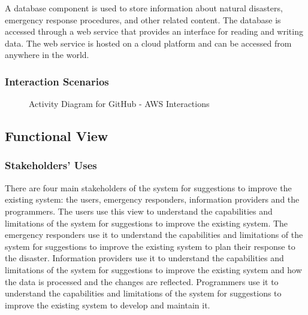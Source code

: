 \documentclass[a4paper]{article}
\begin{document}
    A database component is used to store information about natural disasters, emergency response procedures, and other related
    content. The database is accessed through a web service that provides an interface for reading and writing data. The web
    service is hosted on a cloud platform and can be accessed from anywhere in the world.
    
    \begin{table}[H]
    \end{table}
    \vspace{1cm}

    \subsubsection{Interaction Scenarios}
    \begin{figure}
        
        \caption{Activity Diagram for GitHub - AWS Interactions}
    \end{figure}
    
    \subsection{Functional View}
    \subsubsection{Stakeholders' Uses}
    There are four main stakeholders of the system for suggestions to improve the existing system: the users, emergency responders,
    information providers and the programmers. The users use this view to understand the capabilities and limitations of the system
    for suggestions to improve the existing system. The emergency responders use it to understand the capabilities and limitations
    of the system for suggestions to improve the existing system to plan their response to the disaster. Information providers use
    it to understand the capabilities and limitations of the system for suggestions to improve the existing system and how the data
    is processed and the changes are reflected. Programmers use it to understand the capabilities and limitations of the system for
    suggestions to improve the existing system to develop and maintain it.
\end{document}
